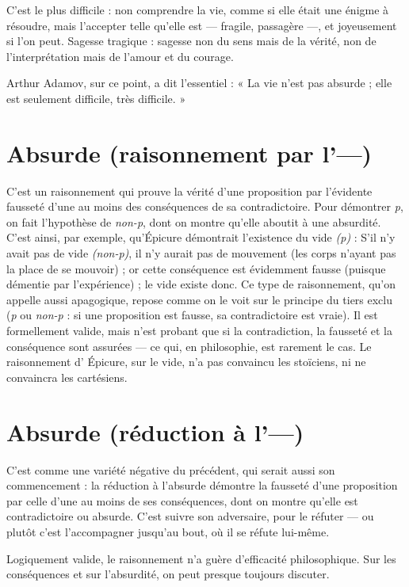 C’est le plus difficile : non comprendre la vie, comme si elle était une
énigme à résoudre, mais l’accepter telle qu’elle est — fragile, passagère —, et
joyeusement si l’on peut. Sagesse tragique : sagesse non du sens mais de la
vérité, non de l'interprétation mais de l’amour et du courage.

Arthur Adamov, sur ce point, a dit l'essentiel : « La vie n’est pas absurde ;
elle est seulement difficile, très difficile. »

\section{Absurde (raisonnement par l'—)}
C'est un raisonnement qui prouve
la vérité d’une proposition par
l’évidente fausseté d’une au moins des conséquences de sa contradictoire.
Pour démontrer {\it p}, on fait l'hypothèse de {\it non-p}, dont on montre qu’elle
aboutit à une absurdité. C’est ainsi, par exemple, qu'Épicure démontrait
l'existence du vide {\it (p)} : S'il n’y avait pas de vide {\it (non-p)}, il n’y aurait pas de
mouvement (les corps n’ayant pas la place de se mouvoir) ; or cette conséquence
est évidemment fausse (puisque démentie par l’expérience) ; le vide
existe donc. Ce type de raisonnement, qu’on appelle aussi apagogique,
repose comme on le voit sur le principe du tiers exclu ({\it p} ou {\it non-p} : si une
proposition est fausse, sa contradictoire est vraie). Il est formellement valide,
mais n’est probant que si la contradiction, la fausseté et la conséquence sont
assurées — ce qui, en philosophie, est rarement le cas. Le raisonnement
d’ Épicure, sur le vide, n’a pas convaincu les stoïciens, ni ne convaincra les
cartésiens.

\section{Absurde (réduction à l'—)}
C’est comme une variété négative du précédent,
qui serait aussi son commencement :
la réduction à l'absurde démontre la fausseté d’une proposition par celle
d’une au moins de ses conséquences, dont on montre qu’elle est contradictoire
ou absurde. C’est suivre son adversaire, pour le réfuter — ou plutôt c’est
l’accompagner jusqu’au bout, où il se réfute lui-même.

Logiquement valide, le raisonnement n’a guère d’efficacité philosophique.
Sur les conséquences et sur l’absurdité, on peut presque toujours discuter.

